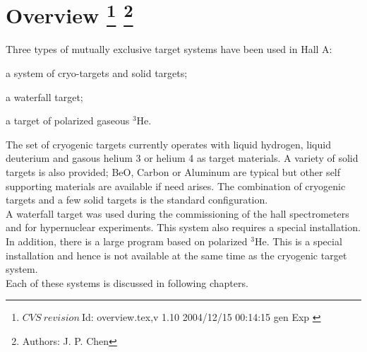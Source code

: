 \chapter[Overview]{ Overview
\label{sec:targets-overv}
\footnote{
  $CVS~revision~ $Id: overview.tex,v 1.10 2004/12/15 00:14:15 gen Exp $ $ }
\footnote{Authors: J. P. Chen }
}

Three types of mutually exclusive target systems have been used in Hall A:

\begin{list}{.~}{\setlength{\itemsep}{-0.15cm}}
  \item a system of cryo-targets and solid targets;
  \item a waterfall target;
  \item a target of polarized gaseous $^3$He.
\end{list}

The set of
cryogenic targets currently operates with liquid hydrogen, liquid
deuterium and gasous helium 3 or helium 4
as target materials.
A variety of solid targets is also provided; BeO, Carbon or
Aluminum are typical but other self supporting materials are available if need arises.
The combination of cryogenic targets and a few solid targets is
the standard configuration. \\

A waterfall target was used during the commissioning of
the hall spectrometers and for hypernuclear experiments. This system also 
requires a special installation. \\

In addition,
there is a large program based on polarized $^3$He. This
is a special installation and hence is not available at the same
time as the cryogenic target system.\\

Each of these systems is discussed in following chapters.
%
%
%
%
%
%
%
%
%
%
